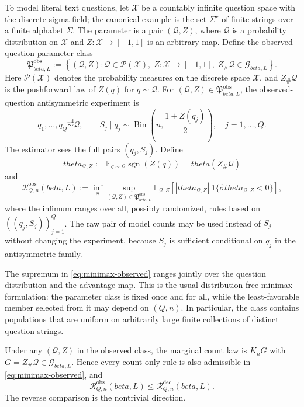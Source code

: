 \documentclass[11pt]{article}
\def\beta{beta}%
\def\theta{theta}%
\newcommand{\E}{\mathbb E}
\newcommand{\one}{\mathbf 1}
\newcommand{\sgn}{\operatorname{sgn}}
\newcommand{\Bin}{\operatorname{Bin}}
\newcommand{\calQ}{\mathcal Q}
\newcommand{\calG}{\mathcal G}
\newcommand{\calR}{\mathcal R}
\begin{document}
To model literal text questions, let $\mathcal X$ be a countably infinite question space with the discrete sigma-field; the canonical example is the set $\Sigma^\star$ of finite strings over a finite alphabet $\Sigma$.  The parameter is a pair $(\calQ,Z)$, where $\calQ$ is a probability distribution on $\mathcal X$ and $Z:\mathcal X\to[-1,1]$ is an arbitrary map.  Define the observed-question parameter class
\begin{equation}
\label{eq:observed-parameter-class}
\mathfrak P^{\mathrm{obs}}_{\beta,L}
:=
\left\{
(\calQ,Z):
\calQ\in\mathcal P(\mathcal X),\;
Z:\mathcal X\to[-1,1],\;
Z_\#\calQ\in\calG_{\beta,L}
\right\}.
\end{equation}
Here $\mathcal P(\mathcal X)$ denotes the probability measures on the discrete space $\mathcal X$, and $Z_\#\calQ$ is the pushforward law of $Z(q)$ for $q\sim\calQ$.  For $(\calQ,Z)\in\mathfrak P^{\mathrm{obs}}_{\beta,L}$, the observed-question antisymmetric experiment is
\begin{equation}
\label{eq:full-observed-scalar}
q_1,\dots,q_Q\overset{\mathrm{iid}}{\sim}\calQ,
\qquad
S_j\mid q_j
\sim
\Bin\!\left(n,\frac{1+Z(q_j)}2\right),
\quad j=1,\dots,Q.
\end{equation}
The estimator sees the full pairs $(q_j,S_j)$.  Define
\[
\theta_{\calQ,Z}
:=
\E_{q\sim\calQ}\sgn(Z(q))
=
\theta(Z_\#\calQ)
\]
and
\begin{equation}
\label{eq:minimax-observed}
\calR^{\mathrm{obs}}_{Q,n}(\beta,L)
:=
\inf_{\widehat\sigma}
\sup_{(\calQ,Z)\in\mathfrak P^{\mathrm{obs}}_{\beta,L}}
\E_{\calQ,Z}\!\left[
|\theta_{\calQ,Z}|\,
\one\{\widehat\sigma\theta_{\calQ,Z}<0\}
\right],
\end{equation}
where the infimum ranges over all, possibly randomized, rules based on $((q_j,S_j))_{j=1}^Q$.  The raw pair of model counts may be used instead of $S_j$ without changing the experiment, because $S_j$ is sufficient conditional on $q_j$ in the antisymmetric family.

The supremum in \eqref{eq:minimax-observed} ranges jointly over the question distribution and the advantage map.  This is the usual distribution-free minimax formulation: the parameter class is fixed once and for all, while the least-favorable member selected from it may depend on $(Q,n)$.  In particular, the class contains populations that are uniform on arbitrarily large finite collections of distinct question strings.

Under any $(\calQ,Z)$ in the observed class, the marginal count law is $K_nG$ with $G=Z_\#\calQ\in\calG_{\beta,L}$.  Hence every count-only rule is also admissible in \eqref{eq:minimax-observed}, and
\begin{equation}
\label{eq:obs-le-count}
\calR^{\mathrm{obs}}_{Q,n}(\beta,L)
\le
\calR^{\mathrm{dec}}_{Q,n}(\beta,L).
\end{equation}
The reverse comparison is the nontrivial direction.
\end{document}
